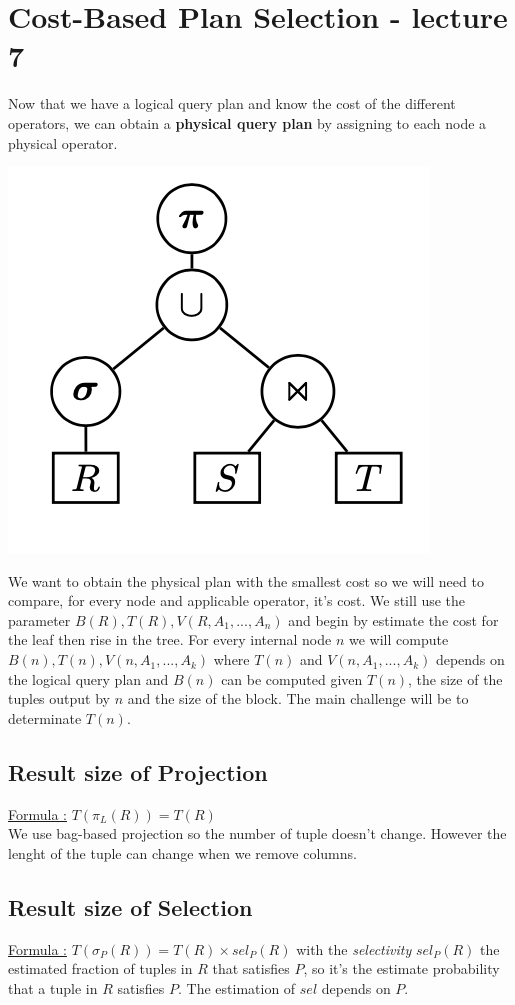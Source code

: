 \documentclass[12pt,a4paper]{article}
\begin{document}
\section{Cost-Based Plan Selection - lecture 7}
Now that we have a logical query plan and know the cost of the different operators, we can obtain a \textbf{physical query plan} by assigning to each node a physical operator.
\begin{center}
\includegraphics[scale=0.5]{img/img19.png}
\end{center} 
We want to obtain the physical plan with the smallest cost so we will need to compare, for every node and applicable operator, it's cost. We still use the parameter $B(R),T(R),V(R,A_1,...,A_n)$ and begin by estimate the cost for the leaf then rise in the tree. For every internal node $n$ we will compute $B(n), T(n), V(n,A_1,...,A_k)$ where $T(n)$ and $V(n,A_1,...,A_k)$ depends on the logical query plan and $B(n)$ can be computed given $T(n)$, the size of the tuples output by $n$ and the size of the block. The main challenge will be to determinate $T(n)$.

\subsection{Result size of Projection}
\underline{Formula :} $T(\pi_L (R)) = T(R)$\\
We use bag-based projection so the number of tuple doesn't change. However the lenght of the tuple can change when we remove columns.

\subsection{Result size of Selection}
\underline{Formula :} $T(\sigma_P (R)) = T(R) \times sel_P (R)$ 
with the \emph{selectivity} $sel_P (R)$ the estimated fraction of tuples in $R$ that satisfies $P$, so it's the estimate probability that a tuple in $R$ satisfies $P$. The estimation of $sel$ depends on $P$.
\end{document}
